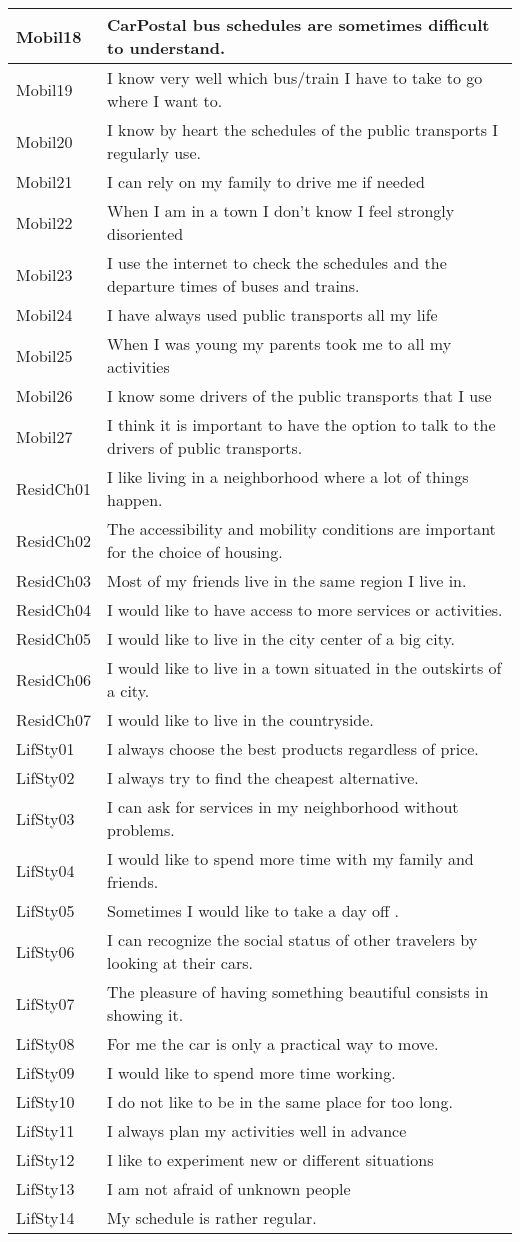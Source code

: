 \documentclass[12pt,a4paper]{article}
\begin{document}
\begin{longtable}{||p{4cm}|p{9cm}||}
\hline 
Mobil18 & CarPostal bus schedules are sometimes difficult to understand.\tabularnewline
\hline 
Mobil19 & I know very well which bus/train I have to take to go where I want to.\tabularnewline
\hline 
Mobil20 & I know by heart the schedules of the public transports I regularly use. \tabularnewline
\hline 
Mobil21 & I can rely on my family to drive me if needed\tabularnewline
\hline 
Mobil22 & When I am in a town I don't know I feel strongly disoriented\tabularnewline
\hline 
Mobil23 & I use the internet to check the schedules and the departure times of buses and trains.\tabularnewline
\hline 
Mobil24 & I have always used public transports all my life\tabularnewline
\hline 
Mobil25 & When I was young my parents took me to all my activities\tabularnewline
\hline 
Mobil26 & I know some drivers of the public transports that I use \tabularnewline
\hline 
Mobil27 & I think it is important to have the option to talk to the drivers of public transports.\tabularnewline
\hline 
ResidCh01 & I like living in a neighborhood where a lot of things happen. \tabularnewline
\hline 
ResidCh02 & The accessibility and mobility conditions are important for the choice of housing. \tabularnewline
\hline 
ResidCh03 & Most of my friends live in the same region I live in.\tabularnewline
\hline 
ResidCh04 & I would like to have access to more services or activities. \tabularnewline
\hline 
ResidCh05 & I would like to live in the city center of a big city.\tabularnewline
\hline 
ResidCh06 & I would like to live in a town situated in the outskirts of a city. \tabularnewline
\hline 
ResidCh07 & I would like to live in the countryside.\tabularnewline
\hline 
LifSty01 & I always choose the best products regardless of price. \tabularnewline
\hline 
LifSty02 & I always try to find the cheapest alternative. \tabularnewline
\hline 
LifSty03 & I can ask for services in my neighborhood without problems. \tabularnewline
\hline 
LifSty04 & I would like to spend more time with my family and friends. \tabularnewline
\hline 
LifSty05 & Sometimes I would like to take a day off .\tabularnewline
\hline 
LifSty06 & I can recognize the social status of other travelers by looking at their cars.\tabularnewline
\hline 
LifSty07 & The pleasure of having something beautiful consists in showing it. \tabularnewline
\hline 
LifSty08 & For me the car is only a practical way to move. \tabularnewline
\hline 
LifSty09 & I would like to spend more time working.\tabularnewline
\hline 
LifSty10 & I do not like to be in the same place for too long.\tabularnewline
\hline 
LifSty11 & I always plan my activities well in advance \tabularnewline
\hline 
LifSty12 & I like to experiment new or different situations\tabularnewline
\hline 
LifSty13 & I am not afraid of unknown people\tabularnewline
\hline 
LifSty14 & My schedule is rather regular.\tabularnewline
\hline 
\hline 
\end{longtable}
\end{document}
